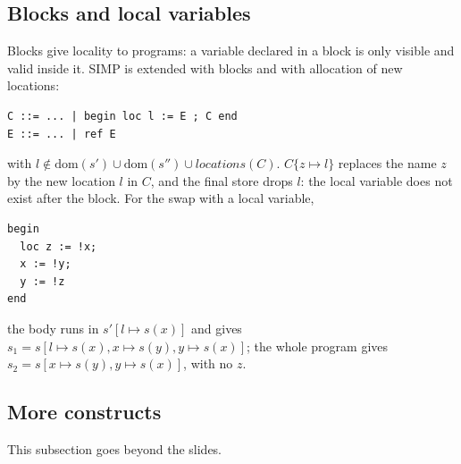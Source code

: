 \subsection{Blocks and local variables}

Blocks give locality to programs: a variable declared in a block is only
visible and valid inside it. SIMP is extended with blocks and with
allocation of new locations:
\begin{lstlisting}
C ::= ... | begin loc l := E ; C end
E ::= ... | ref E
\end{lstlisting}
with $l \notin \mathrm{dom}(s') \cup \mathrm{dom}(s'') \cup \mathit{locations}(C)$. $C\{z \mapsto l\}$
replaces the name $z$ by the new location $l$ in $C$, and the final store
drops $l$: the local variable does not exist after the block. For the swap
with a local variable,
\begin{lstlisting}
begin
  loc z := !x;
  x := !y;
  y := !z
end
\end{lstlisting}
the body runs in $s'[l \mapsto s(x)]$ and gives $s_1 = s[l \mapsto s(x), x \mapsto s(y), y \mapsto s(x)]$;
the whole program gives $s_2 = s[x \mapsto s(y), y \mapsto s(x)]$, with no $z$.

\subsection{More constructs}

This subsection goes beyond the slides.


